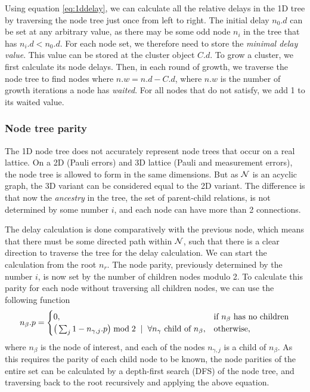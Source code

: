 Using equation \ref{eq:1ddelay}, we can calculate all the relative delays in the 1D tree by traversing the node tree just once from left to right. The initial delay $n_0.d$ can be set at any arbitrary value, as there may be some odd node $n_i$ in the tree that has $n_i.d < n_0.d$. For each node set, we therefore need to store the \emph{minimal delay value}. This value can be stored at the cluster object $C.d$. To grow a cluster, we first calculate its node delays. Then, in each round of growth, we traverse the node tree to find nodes where $n.w = n.d - C.d$, where $n.w$ is the number of growth iterations a node has \emph{waited}. For all nodes that do not satisfy, we add 1 to its waited value.

\subsubsection{Node tree parity}

The 1D node tree does not accurately represent node trees that occur on a real lattice. On a 2D (Pauli errors) and 3D lattice (Pauli and measurement errors), the node tree is allowed to form in the same dimensions. But as $\mathcal{N}$ is an acyclic graph, the 3D variant can be considered equal to the 2D variant. The difference is that now the \emph{ancestry} in the tree, the set of parent-child relations, is not determined by some number $i$, and each node can have more than 2 connections.

The delay calculation is done comparatively with the previous node, which means that there must be some directed path within $\mathcal{N}$, such that there is a clear direction to traverse the tree for the delay calculation. We can start the calculation from the root $n_r$. The node parity, previously determined by the number $i$, is now set by the number of children nodes modulo 2. To calculate this parity for each node without traversing all children nodes, we can use the following function
\begin{equation}\label{eq:nodeparitypart}
  n_\beta.p =
  \begin{cases}
    0, & \mbox{if $n_\beta$ has no children}  \\
    \big( \sum_{j} 1-n_{\gamma,j}.p \big ) \bmod 2 \hspace{.2cm} | \hspace{.2cm} \forall n_\gamma \mbox{ child of } n_\beta, & \mbox{otherwise},
  \end{cases}
\end{equation}
where $n_\beta$ is the node of interest, and each of the nodes $n_{\gamma,j}$ is a child of $n_\beta$. As this requires the parity of each child node to be known, the node parities of the entire set can be calculated by a depth-first search (DFS) of the node tree, and traversing back to the root recursively and applying the above equation.


